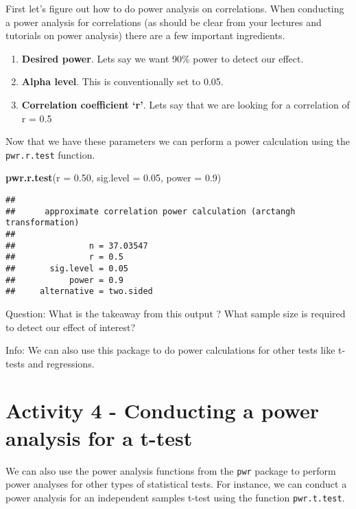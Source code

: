 \documentclass[
]{book}
\newenvironment{Shaded}{\begin{snugshade}}{\end{snugshade}}
\newcommand{\AttributeTok}[1]{\textcolor[rgb]{0.13,0.29,0.53}{#1}}
\newcommand{\FloatTok}[1]{\textcolor[rgb]{0.00,0.00,0.81}{#1}}
\newcommand{\FunctionTok}[1]{\textcolor[rgb]{0.13,0.29,0.53}{\textbf{#1}}}
\newcommand{\NormalTok}[1]{#1}
\providecommand{\tightlist}{%
  \setlength{\itemsep}{0pt}\setlength{\parskip}{0pt}}
\begin{document}
First let's figure out how to do power analysis on correlations. When conducting a power analysis for correlations (as should be clear from your lectures and tutorials on power analysis) there are a few important ingredients.

\begin{enumerate}
\def\labelenumi{\arabic{enumi}.}
\tightlist
\item
  \textbf{Desired power}. Lets say we want 90\% power to detect our effect.
\item
  \textbf{Alpha level}. This is conventionally set to 0.05.
\item
  \textbf{Correlation coefficient `r'}. Lets say that we are looking for a correlation of r = 0.5
\end{enumerate}

Now that we have these parameters we can perform a power calculation using the \texttt{pwr.r.test} function.

\begin{Shaded}
\begin{Highlighting}[]
\FunctionTok{pwr.r.test}\NormalTok{(}\AttributeTok{r =} \FloatTok{0.50}\NormalTok{, }\AttributeTok{sig.level =} \FloatTok{0.05}\NormalTok{, }\AttributeTok{power =} \FloatTok{0.9}\NormalTok{)}
\end{Highlighting}
\end{Shaded}

\begin{verbatim}
## 
##      approximate correlation power calculation (arctangh transformation) 
## 
##               n = 37.03547
##               r = 0.5
##       sig.level = 0.05
##           power = 0.9
##     alternative = two.sided
\end{verbatim}

Question: What is the takeaway from this output ? What sample size is required to detect our effect of interest?

Info: We can also use this package to do power calculations for other tests like t-tests and regressions.

\section{Activity 4 - Conducting a power analysis for a t-test}\label{activity-4---conducting-a-power-analysis-for-a-t-test}

We can also use the power analysis functions from the \texttt{pwr} package to perform power analyses for other types of statistical tests. For instance, we can conduct a power analysis for an independent samples t-test using the function \texttt{pwr.t.test}.
\end{document}
